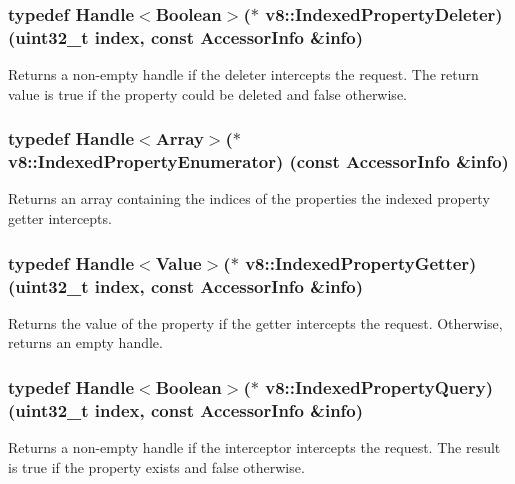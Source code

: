 \subsubsection[{Indexed\+Property\+Deleter}]{\setlength{\rightskip}{0pt plus 5cm}typedef {\bf Handle}$<${\bf Boolean}$>$($\ast$ v8\+::\+Indexed\+Property\+Deleter) (uint32\+\_\+t index, const {\bf Accessor\+Info} \&info)}\label{namespacev8_a3a7c18d62a0d1f2d12845051920be592}
Returns a non-\/empty handle if the deleter intercepts the request. The return value is true if the property could be deleted and false otherwise. \hypertarget{namespacev8_a15ab299eff53946ab483b762a4cb20dc}{}
\subsubsection[{Indexed\+Property\+Enumerator}]{\setlength{\rightskip}{0pt plus 5cm}typedef {\bf Handle}$<${\bf Array}$>$($\ast$ v8\+::\+Indexed\+Property\+Enumerator) (const {\bf Accessor\+Info} \&info)}\label{namespacev8_a15ab299eff53946ab483b762a4cb20dc}
Returns an array containing the indices of the properties the indexed property getter intercepts. \hypertarget{namespacev8_abf3be19b5157493da3859987cc50c6ab}{}
\subsubsection[{Indexed\+Property\+Getter}]{\setlength{\rightskip}{0pt plus 5cm}typedef {\bf Handle}$<${\bf Value}$>$($\ast$ v8\+::\+Indexed\+Property\+Getter) (uint32\+\_\+t index, const {\bf Accessor\+Info} \&info)}\label{namespacev8_abf3be19b5157493da3859987cc50c6ab}
Returns the value of the property if the getter intercepts the request. Otherwise, returns an empty handle. \hypertarget{namespacev8_a4b360e915c7c5c1591e946f701d7cc28}{}
\subsubsection[{Indexed\+Property\+Query}]{\setlength{\rightskip}{0pt plus 5cm}typedef {\bf Handle}$<${\bf Boolean}$>$($\ast$ v8\+::\+Indexed\+Property\+Query) (uint32\+\_\+t index, const {\bf Accessor\+Info} \&info)}\label{namespacev8_a4b360e915c7c5c1591e946f701d7cc28}
Returns a non-\/empty handle if the interceptor intercepts the request. The result is true if the property exists and false otherwise. \hypertarget{namespacev8_a3ca53e294b9b695b3777af904ca942b6}{}
